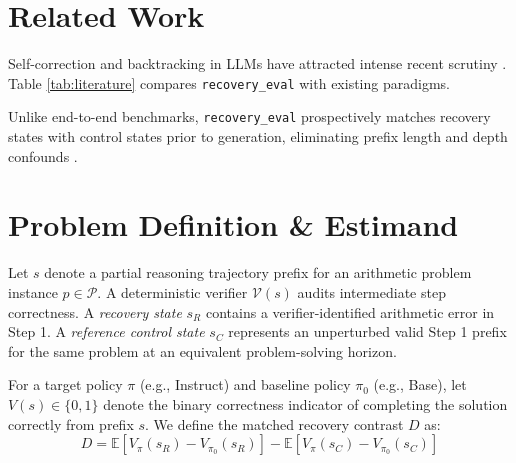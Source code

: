 \documentclass[10pt,conference]{IEEEtran}
\begin{document}
\section{Related Work}
Self-correction and backtracking in LLMs have attracted intense recent scrutiny \cite{snell2024scaling, wang2022selfconsistency, huang2023large}. Table \ref{tab:literature} compares \texttt{recovery\_eval} with existing paradigms.

\begin{table}[htbp]
\caption{Comparison with Existing Reasoning Evaluation Frameworks}
\label{tab:literature}
\centering
{}
\end{table}

Unlike end-to-end benchmarks, \texttt{recovery\_eval} prospectively matches recovery states with control states prior to generation, eliminating prefix length and depth confounds \cite{rosenbaum1983central, ho2007matching, austin2011introduction}.

\section{Problem Definition \& Estimand}
Let $s$ denote a partial reasoning trajectory prefix for an arithmetic problem instance $p \in \mathcal{P}$. A deterministic verifier $\mathcal{V}(s)$ audits intermediate step correctness. A \textit{recovery state} $s_R$ contains a verifier-identified arithmetic error in Step 1. A \textit{reference control state} $s_C$ represents an unperturbed valid Step 1 prefix for the same problem at an equivalent problem-solving horizon.

For a target policy $\pi$ (e.g., Instruct) and baseline policy $\pi_0$ (e.g., Base), let $V(s) \in \{0, 1\}$ denote the binary correctness indicator of completing the solution correctly from prefix $s$. We define the matched recovery contrast $D$ as:
\begin{equation}
D = \mathbb{E}[V_{\pi}(s_R) - V_{\pi_0}(s_R)] - \mathbb{E}[V_{\pi}(s_C) - V_{\pi_0}(s_C)]
\end{equation}
\end{document}
